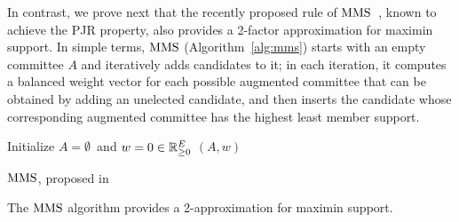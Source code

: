 


In contrast, we prove next that the recently proposed rule of $\operatorname{MMS}$~\cite{sanchez2016maximin}, known to achieve the PJR property, also provides a 2-factor approximation for maximin support. In simple terms, $\operatorname{MMS}$ (Algorithm~\ref{alg:mms}) starts with an empty committee $A$ and iteratively adds candidates to it; in each iteration, it computes a balanced weight vector for each possible augmented committee that can be obtained by adding an unelected candidate, and then inserts the candidate whose corresponding augmented committee has the highest least member support.


\begin{algorithm}[htb]\label{alg:mms}
\SetAlgoLined
{}
Initialize $A=\emptyset$\ and $w=0\in \mathbb{R}_{\geq 0}^E$\;
\Return $(A,w)$\;
\caption{$\operatorname{MMS}$, proposed in~\cite{sanchez2016maximin}}
\end{algorithm}

\begin{theorem}\label{thm:mms}
The $\operatorname{MMS}$ algorithm provides a 2-approximation for maximin support.
\end{theorem}

